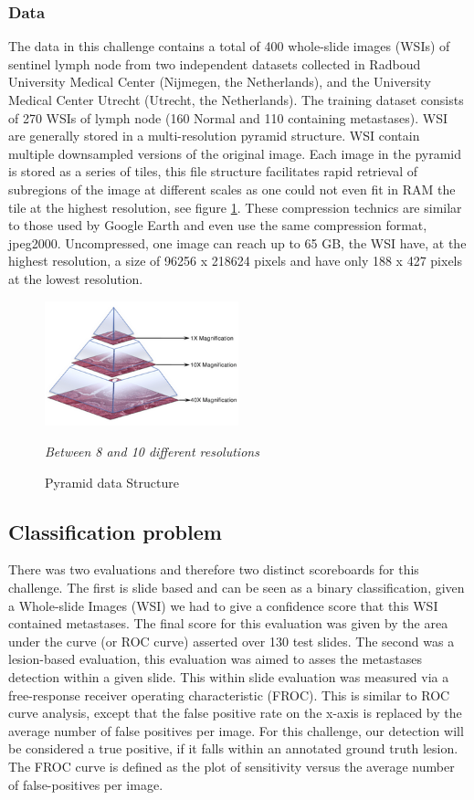 \documentclass[a4paper,10pt]{article}
\begin{document}
\subsubsection*{Data}
The data in this challenge contains a total of 400 whole-slide images (WSIs) of sentinel lymph node from two independent datasets collected in Radboud University Medical Center (Nijmegen, the Netherlands), and the University Medical Center Utrecht (Utrecht, the Netherlands). The training dataset consists of 270 WSIs of lymph node (160 Normal and 110 containing metastases). WSI are generally stored in a multi-resolution pyramid structure. WSI contain multiple downsampled versions of the original image. Each image in the pyramid is stored as a series of tiles, this file structure facilitates rapid retrieval of subregions of the image at different scales as one could not even fit in RAM the tile at the highest resolution, see figure \ref{fig: Pyramid}. These compression technics are similar to those used by Google Earth and even use the same compression format, jpeg2000. Uncompressed, one image can reach up to 65 GB, the WSI have, at the highest resolution, a size of 96256 x 218624 pixels and have only 188 x 427 pixels at the lowest resolution.


\begin{figure}[!ht]
\centering
\includegraphics[width=0.5\textwidth]{pyramid.png}
\caption{Pyramid data Structure}
\textit{Between 8 and 10 different resolutions}
\label{fig: Pyramid}
\end{figure}


\subsection{Classification problem}
There was two evaluations and therefore two distinct scoreboards for this challenge. The first is slide based and can be seen as a binary classification, given a Whole-slide Images (WSI) we had to give a confidence score that this WSI contained metastases. The final score for this evaluation was given by the area under the curve (or ROC curve) asserted over 130 test slides. The second was a lesion-based evaluation, this evaluation was aimed to asses the metastases detection within a given slide. This within slide evaluation was measured via a free-response receiver operating characteristic (FROC). This is similar to ROC curve analysis, except that the false positive rate on the x-axis is replaced by the average number of false positives per image. For this challenge, our detection will be considered a true positive, if it falls within an annotated ground truth lesion. The FROC curve is defined as the plot of sensitivity versus the average number of false-positives per image. 
\end{document}
